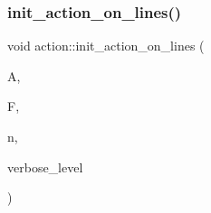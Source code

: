 \subsubsection{\texorpdfstring{init\+\_\+action\+\_\+on\+\_\+lines()}{init\_action\_on\_lines()}}
{\footnotesize\ttfamily void action\+::init\+\_\+action\+\_\+on\+\_\+lines (\begin{DoxyParamCaption}\item[{\mbox{\hyperlink{classaction}{action}} $\ast$}]{A,  }\item[{\mbox{\hyperlink{classfinite__field}{finite\+\_\+field}} $\ast$}]{F,  }\item[{\mbox{\hyperlink{galois_8h_a09fddde158a3a20bd2dcadb609de11dc}{I\+NT}}}]{n,  }\item[{\mbox{\hyperlink{galois_8h_a09fddde158a3a20bd2dcadb609de11dc}{I\+NT}}}]{verbose\+\_\+level }\end{DoxyParamCaption})}

\mbox{\label{classaction_af2729078ff35ee216d9b435ec9f9bbbe}} 
